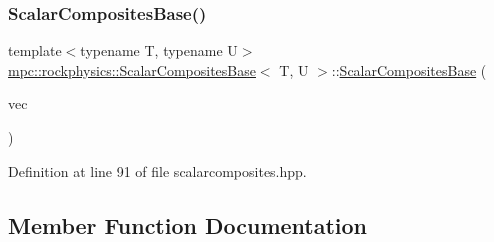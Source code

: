 \subsubsection{\texorpdfstring{Scalar\+Composites\+Base()}{ScalarCompositesBase()}\hspace{0.1cm}{\footnotesize\ttfamily [2/2]}}
{\footnotesize\ttfamily template$<$typename T, typename U$>$ \\
\mbox{\hyperlink{classmpc_1_1rockphysics_1_1_scalar_composites_base}{mpc\+::rockphysics\+::\+Scalar\+Composites\+Base}}$<$ T, U $>$\+::\mbox{\hyperlink{classmpc_1_1rockphysics_1_1_scalar_composites_base}{Scalar\+Composites\+Base}} (\begin{DoxyParamCaption}\item[{const std\+::vector$<$ std\+::tuple$<$ \mbox{\hyperlink{structmpc_1_1rockphysics_1_1_bulk_modulus_type}{mpc\+::rockphysics\+::\+Bulk\+Modulus\+Type}}$<$ T $>$, \mbox{\hyperlink{structmpc_1_1rockphysics_1_1_shear_modulus_type}{mpc\+::rockphysics\+::\+Shear\+Modulus\+Type}}$<$ T $>$, \mbox{\hyperlink{structmpc_1_1rockphysics_1_1_density_type}{mpc\+::rockphysics\+::\+Density\+Type}}$<$ T $>$, \mbox{\hyperlink{structmpc_1_1rockphysics_1_1_volume_fraction_type}{mpc\+::rockphysics\+::\+Volume\+Fraction\+Type}}$<$ T $>$ $>$ $>$ \&}]{vec }\end{DoxyParamCaption})\hspace{0.3cm}{\ttfamily [inline]}}



Definition at line 91 of file scalarcomposites.\+hpp.



\subsection{Member Function Documentation}
\mbox{\label{classmpc_1_1rockphysics_1_1_scalar_composites_base_a946f9e52e72eb9582c4cbe8ef971f815}} 
